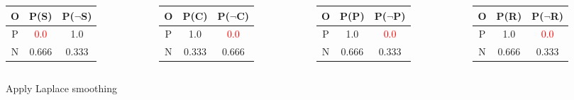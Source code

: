 \documentclass[aspectratio=169, 10pt]{beamer}
\begin{document}
\begin{frame}[t]
    \begin{columns}
        \begin{column}{0.25\textwidth}
            \begin{table}[]
                \small
                \begin{tabular}{ccc}
                O & P(S) & P($\neg$S) \\ \hline
                P & \textcolor{red}{0.0} & 1.0 \\
                N & 0.666 & 0.333 \\
                \end{tabular}
            \end{table}
        \end{column}
        \begin{column}{0.25\textwidth}
            \begin{table}[]
                \small
                \begin{tabular}{ccc}
                O & P(C) & P($\neg$C) \\ \hline
                P & 1.0 & \textcolor{red}{0.0} \\
                N & 0.333 & 0.666 \\
                \end{tabular}
            \end{table}
        \end{column}
        \begin{column}{0.25\textwidth}
            \begin{table}[]
                \small
                \begin{tabular}{ccc}
                O & P(P) & P($\neg$P) \\ \hline
                P & 1.0 & \textcolor{red}{0.0} \\
                N & 0.666 & 0.333 \\
                \end{tabular}
            \end{table}
        \end{column}
        \begin{column}{0.25\textwidth}
            \begin{table}[]
                \small
                \begin{tabular}{ccc}
                O & P(R) & P($\neg$R) \\ \hline
                P & 1.0 & \textcolor{red}{0.0} \\
                N & 0.666 & 0.333 \\
                \end{tabular}
            \end{table}
        \end{column}
    \end{columns}

    Apply Laplace smoothing

\end{frame}
\end{document}
